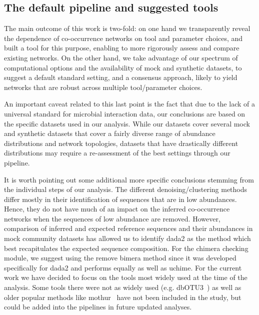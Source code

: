   \subsection*{The default pipeline and suggested tools}

  The main outcome of this work is two-fold: on one hand we transparently reveal the dependence of co-occurrence networks on tool and parameter choices, and built a tool for this purpose, enabling to more rigorously assess and compare existing networks.
  On the other hand, we take advantage of our spectrum of computational options and the availability of mock and synthetic datasets, to suggest a default standard setting, and a consensus approach, likely to yield networks that are robust across multiple tool/parameter choices.

  An important caveat related to this last point is the fact that due to the lack of a universal standard for microbial interaction data, our conclusions are based on the specific datasets used in our analysis.
  While our datasets cover several mock and synthetic datasets that cover a fairly diverse range of abundance distributions and network topologies, datasets that have drastically different distributions may require a re-assessment of the best settings through our pipeline.

  It is worth pointing out some additional more specific conclusions stemming from the individual steps of our analysis.
  The different denoising/clustering methods differ mostly in their identification of sequences that are in low abundances.
  Hence, they do not have much of an impact on the inferred co-occurrence networks when the sequences of low abundance are removed.
  However, comparison of inferred and expected reference sequences and their abundances in mock community datasets has allowed us to identify \ac{dada2} as the method which best recapitulates the expected sequence composition.
  For the chimera checking module, we suggest using the remove bimera method since it was developed specifically for \ac{dada2} and performs equally as well as uchime.
  For the current work we have decided to focus on the tools most widely used at the time of the analysis.
  Some tools there were not as widely used (e.g. dbOTU3~\cite{Olesen2017}) as well as older popular methods like mothur~\cite{Schloss2009} have not been included in the study, but could be added into the pipelines in future updated analyses.

